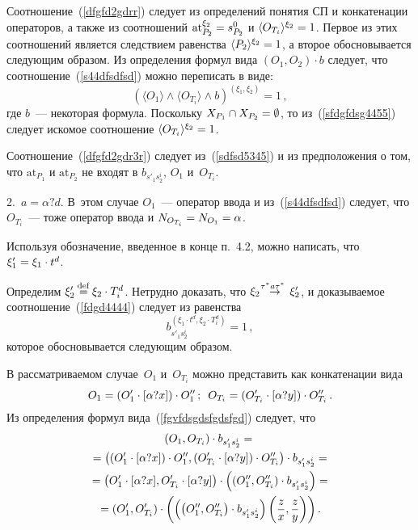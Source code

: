 \begin{multicols}{2}
Соотношение~(\ref{dfgfd2gdrr}) следует из определений понятия СП и конкатенации операторов,
а также из соотношений $\mathrm{at}_{P_2}^{\xi_2}\hm=s_{P_2}^0$
и $\langle{O_{T_i}}\rangle^{\xi_2}\hm=1$.
Первое из этих соотношений является следствием равенства $\langle{P_2}\rangle^{\xi_2}\hm=1$,
а второе обосновывается следующим образом.
Из определения формул вида $(O_1,O_2)\cdot b$
следует, что соотношение~(\ref{s44dfsdfsd}) можно переписать в виде:
\begin{equation}
\label{sfdgfdsg4455}
\left(\langle{O_1}\rangle\wedge \langle{O_{T_i}}\rangle
\wedge b \right)^{(\xi_1,\xi_2)} = 1\,,
\end{equation}
где $b$~--- некоторая формула.
Поскольку $X_{P_1}\cap X_{P_2}\hm=\emptyset$,
то из~(\ref{sfdgfdsg4455}) следует искомое
соотношение $\langle{O_{T_i}}\rangle^{\xi_2}\hm=1$.

Соотношение~(\ref{dfgfd2gdr3r}) следует из~(\ref{sdfsd5345}) и из предположения о том, что
 $\mathrm{at}_{P_1}$ и $\mathrm{at}_{P_2}$ не входят в $b_{s'_1s^i_2}$,
$O_1$ и~$O_{T_i}$.

\smallskip

2.\  $a=\alpha?d$. В~этом случае
$O_1$~--- оператор ввода и из~(\ref{s44dfsdfsd}) следует, что
$O_{T_i}$~--- тоже оператор ввода и $N_{O_{T_i}} \hm= N_{O_1}=\alpha$.

Используя обозначение, введенное в конце п.~4.2, можно написать, что
$\xi'_1 \hm= \xi_1\cdot t^d$.


Определим $\xi'_2\mathbin{{\mathop{=}\limits^{\mathrm{def}}}} \xi_2\cdot T_i^d$.
Нетрудно доказать, что $\xi_2 \;\mathop{\to}\limits^{\!\!\!\tau^*a \tau^*}\;\xi'_2$, и доказываемое
соотношение~(\ref{fdgd4444}) следует из равенства
\begin{equation}
\label{1dfgf33dgdrr}
b_{s'_1s^i_2}^{(\xi_1\cdot t^d,\xi_2\cdot T_i^d)}=1\,,
\end{equation}
 которое обосновывается следующим образом.

В рассматриваемом случае~$O_1$ и~$O_{T_i}$ можно представить как
конкатенации вида
$$
O_1=(O'_1\cdot[\alpha?x])\cdot O''_1\,;\enskip
O_{T_i} = (O'_{T_i}\cdot[\alpha?y])\cdot O''_{T_i}\,.
$$
Из определения формул вида~(\ref{fgvfdsgdsfgdsfgd})  следует, что
 \begin{multline}
(O_1, O_{T_i}) \cdot b_{s'_1s^{i}_2}={}\\
{}=
\left((O'_1\cdot[\alpha?x])\cdot O''_1,
(O'_{T_i}\cdot[\alpha?y])\cdot
O''_{T_i}\right) \cdot b_{s'_1s^{i}_2}={}\\
{}=
\left(O'_1\cdot[\alpha?x],
O'_{T_i}\cdot[\alpha?y]
\right) \cdot \left((O''_1,O''_{T_i})\cdot b_{s'_1s^{i}_2}\right)
={}\\
\!\!{}=
(O'_1, O'_{T_i} ) \cdot \left(\left(\left(O''_1,O''_{T_i}\right)\cdot b_{s'_1s^{i}_2}\right)
\left(\displaystyle\frac{\displaystyle z\mathstrut}{\displaystyle x\mathstrut},\displaystyle\frac{\displaystyle z\mathstrut}{\displaystyle y\mathstrut}\right)\right).\!
 \label{1s44dfsdfsd11}
\end{multline}


\end{multicols}
